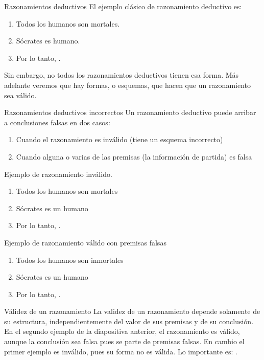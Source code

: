 
\begin{frame}{Razonamientos deductivos}
  El ejemplo clásico de razonamiento deductivo es:
  \begin{enumerate}
    \item Todos los humanos son mortales.
    \item Sócrates es humano.
    \item Por lo tanto, .
  \end{enumerate}
  \jump
  Sin embargo, no todos los razonamientos deductivos tienen esa forma.
  Más adelante veremos que hay formas, o esquemas, que hacen que un razonamiento
  sea válido.
\end{frame}


\begin{frame}{Razonamientos deductivos incorrectos}
  Un razonamiento deductivo puede arribar a conclusiones falsas en dos casos:
  \begin{enumerate}
    \item Cuando el razonamiento es inválido (tiene un esquema incorrecto)
    \item Cuando alguna o varias de las premisas (la información de partida) es falsa
  \end{enumerate}
  \jump
  Ejemplo de razonamiento inválido.
  \begin{enumerate}
    \item Todos los humanos son mortales
    \item Sócrates es un humano
    \item Por lo tanto, .
  \end{enumerate}
  \jump
  Ejemplo de razonamiento válido con premisas falsas
  \begin{enumerate}
    \item Todos los humanos son inmortales
    \item Sócrates es un humano
    \item Por lo tanto, .
  \end{enumerate}
\end{frame}


\begin{frame}{Válidez de un razonamiento}
  La validez de un razonamiento depende solamente de su estructura,
  independientemente del valor de sus premisas y de su conclusión.
  \jump
  En el segundo ejemplo de la diapositiva anterior, el razonamiento es
  válido, aunque la conclusión sea falsa pues se parte de premisas falsas.
  \jump
  En cambio el primer ejemplo es inválido, pues su forma no es válida.
  \jump
  Lo importante es: .
\end{frame}

